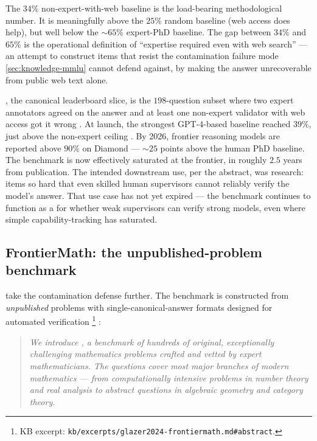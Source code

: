 The $34\%$ non-expert-with-web baseline is the load-bearing
methodological number. It is meaningfully above the $25\%$ random
baseline (web access does help), but well below the $\sim 65\%$
expert-PhD baseline. The gap between $34\%$ and $65\%$ is the operational
definition of ``expertise required even with web search'' --- an
attempt to construct items that resist the contamination failure mode
\cref{sec:knowledge-mmlu} cannot defend against, by making the answer
unrecoverable from public web text alone.

, the canonical leaderboard slice, is the $198$-question
subset where two expert annotators agreed on the answer and at least
one non-expert validator with web access got it wrong
\citep[\S{}sec-diamond]{rein2023-gpqa}. At launch, the strongest
GPT-4-based baseline reached $39\%$, just above the non-expert ceiling
\citep[\S{}sec-ai-baseline]{rein2023-gpqa}. By 2026, frontier reasoning
models are reported above $90\%$ on Diamond --- $\sim 25$ points above
the human PhD baseline. The benchmark is now effectively saturated at
the frontier, in roughly $2.5$ years from publication. The intended
downstream use, per the abstract, was  research:
items so hard that even skilled human supervisors cannot reliably
verify the model's answer. That use case has not yet expired ---
the benchmark continues to function as a  for whether weak
supervisors can verify strong models, even where simple
capability-tracking has saturated.

\subsection{FrontierMath: the unpublished-problem benchmark}
\label{sec:knowledge-frontiermath}

\citet{glazer2024-frontiermath} take the contamination defense further.
The benchmark is constructed from \emph{unpublished} problems with
single-canonical-answer formats designed for automated verification%
\footnote{KB excerpt: \texttt{kb/excerpts/glazer2024-frontiermath.md\#abstract}.}
\citep[\S{}abstract]{glazer2024-frontiermath}:

\begin{quote}\itshape
We introduce , a benchmark of hundreds of original,
exceptionally challenging mathematics problems crafted and vetted by
expert mathematicians. The questions cover most major branches of
modern mathematics --- from computationally intensive problems in
number theory and real analysis to abstract questions in algebraic
geometry and category theory.
\end{quote}

